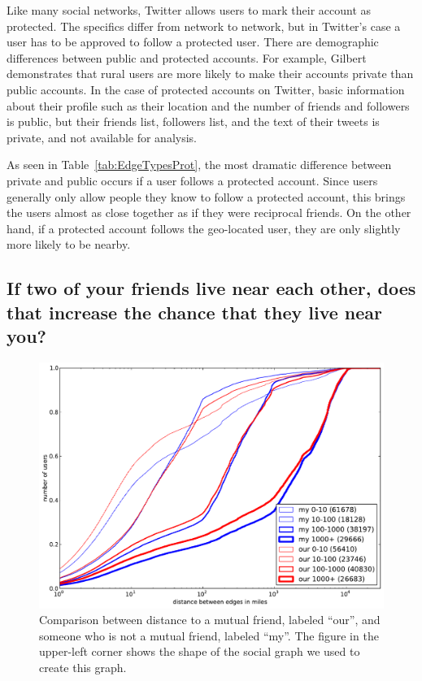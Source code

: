Like many social networks, Twitter allows users to mark their account as
protected. The specifics differ from network to network, but in Twitter's case
a user has to be approved to follow a protected user.
There are demographic differences between public and protected accounts.
For example, Gilbert \cite{gilbert2008network} demonstrates that rural users
are more likely to make their accounts private than public accounts.
In the case of protected accounts on Twitter, basic information
about their profile such as their location and the number of friends and
followers is public, but their friends list, followers list, and the text of
their tweets is private, and not available for analysis.

As seen in Table~\ref{tab:EdgeTypesProt}, the most dramatic difference between
private and public occurs if a user follows a protected account.
%
Since users generally only allow people they know to follow a protected
account, this brings the users almost as close together as if they were
reciprocal friends.
%
On the other hand, if a protected account follows the geo-located user, they
are only slightly more likely to be nearby.

\subsection{If two of your friends live near each other, does that increase the
chance that they live near you?}

\begin{figure}[tb]
\centering
\includegraphics[width=\linewidth]{figures/near_triads.pdf}
\caption{
Comparison between distance to a mutual friend, labeled ``our'', and someone
who is not a mutual friend, labeled ``my''.
The figure in the upper-left corner shows the shape of the social graph we used
to create this graph.
}
\label{fig:NearTriads}
\end{figure}

